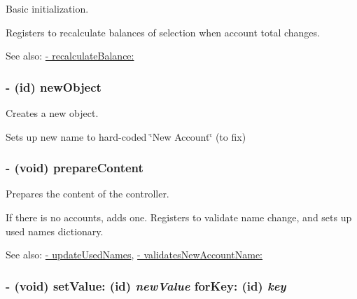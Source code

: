 Basic initialization. 

Registers to recalculate balances of selection when account total changes. \begin{Desc}
\item[See also:]\hyperlink{interface_z_x_account_controller_5fb3f31204f14f03e841ad1c428839ac}{- recalculateBalance:} \end{Desc}
\hypertarget{interface_z_x_account_controller_7c2d8697d2ed15c4fbc55d670564e751}{
\subsubsection[{newObject}]{\setlength{\rightskip}{0pt plus 5cm}- (id) newObject }}
\label{interface_z_x_account_controller_7c2d8697d2ed15c4fbc55d670564e751}


Creates a new object. 

Sets up new name to hard-coded \char`\"{}New Account\char`\"{} (to fix) \hypertarget{interface_z_x_account_controller_b1403533592d33b6fc3a43c7153c27b4}{
\subsubsection[{prepareContent}]{\setlength{\rightskip}{0pt plus 5cm}- (void) prepareContent }}
\label{interface_z_x_account_controller_b1403533592d33b6fc3a43c7153c27b4}


Prepares the content of the controller. 

If there is no accounts, adds one. Registers to validate name change, and sets up used names dictionary. \begin{Desc}
\item[See also:]\hyperlink{interface_z_x_account_controller_489f46d9731a5b0737b028ea9063e202}{- updateUsedNames}, \hyperlink{interface_z_x_account_controller_765323e412d28612c9737af99becf5c8}{- validatesNewAccountName:} \end{Desc}
\hypertarget{interface_z_x_account_controller_275e5ff12dad8038bf3ed96a19aac65e}{
\subsubsection[{setValue:forKey:}]{\setlength{\rightskip}{0pt plus 5cm}- (void) setValue: (id) {\em newValue}\/ forKey: (id) {\em key}}}
\label{interface_z_x_account_controller_275e5ff12dad8038bf3ed96a19aac65e}


